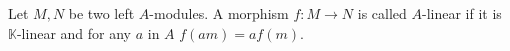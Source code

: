 \documentclass[../thesis.tex]{subfiles}
\begin{document}
\begin{definition}[Modules]
                            



        

        
        

                \end{definition}

                \begin{definition}
                    Let $M, N$ be two left $A$-modules. A morphism $f:M\rightarrow N$ is called $A$-linear if it is $\mathbb{K}$-linear and for any $a$ in $A$ $f(am) = af(m)$.
                \end{definition}
\end{document}

